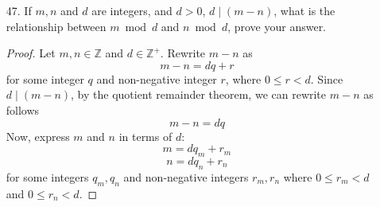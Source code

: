 \documentclass[12pt]{article}
\begin{document}
\begin{enumerate}
\begin{enumerate}
\begin{proof}
                In both cases, we have \( |r| \leq c \).
                
                Now, we prove the backward direction:
                \[ |r| \leq c \rightarrow -c \leq r \leq c. \]
                
                Assume \( |r| \leq c \). By the definition of absolute value, \( |r| \leq c \) means:
                \[ 
                |r| = 
                \begin{cases} 
                r & \text{if } r \geq 0 \\
                -r & \text{if } r < 0 
                \end{cases}
                \leq c.
                \]
                
                - If \( r \geq 0 \), then \( |r| = r \leq c \), thus \( 0 \leq r \leq c \). This implies \( 0 \leq r \leq c \).\\
                - If \( r < 0 \), then \( |r| = -r \leq c \), thus \( -r \leq c \) which implies \( -c \leq r < 0 \).\\
                
                In both cases, we have \( -c \leq r \leq c \).
                
                Therefore, we have shown that:
                \[
                \forall r \in \mathbb{R} \; \forall c \in \mathbb{R}^+ \cup \{0\} \left( -c \leq r \leq c \leftrightarrow |r| \leq c \right).
                \]
                
                \end{proof}

                \newpage

            \item[47.] If $m,n$ and $d$ are integers, and $d>0 $, $ d\mid (m-n)$, what is the relationship between $m \bmod d$ and $n \bmod d$, prove your answer. 
                \begin{proof}
                Let $m, n \in \mathbb{Z}$ and $d \in \mathbb{Z}^+$. Rewrite $m-n$ as
                \[
                m - n = dq + r
                \]
                for some integer $q$ and non-negative integer $r$, where $0 \leq r < d$. Since $d \mid (m-n)$, by the quotient remainder theorem, we can rewrite $m-n$ as follows
                \[
                m-n = dq
                \]
                Now, express $m$ and $n$ in terms of $d$:
                \[
                m = dq_m + r_m
                \]
                \[
                n = dq_n + r_n
                \]
                for some integers $q_m, q_n$ and non-negative integers $r_m, r_n$ where $0 \leq r_m < d$ and $0 \leq r_n < d$.
                

\end{proof}
\end{enumerate}
\end{enumerate}
\end{document}
